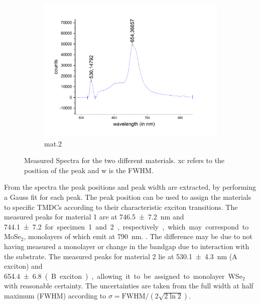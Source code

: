 \begin{figure}[H]
\begin{subfigure}{0.51\textwidth}
        \centering
        \includegraphics[width=\textwidth]{img/output_t1/spekt_m2}
        \caption{mat.2}
	      \label{fig_mono_spec3_1dspec}
    \end{subfigure}
    \caption{Measured Spectra for the two different materials. xc refers to the position of the peak and w is the FWHM.}
	\label{fig_mono_1dspectra} %
\end{figure}

From the spectra the peak positions and peak width are extracted, by performing a Gauss fit for each peak.
The peak position can be used to assign the materials to specific TMDCs according to their characteristic exciton transitions.
The measured peaks for material 1 are at \SI{746,5\pm 7,2}{nm} and \SI{744,1 \pm 7,2} for specimen 1 and 2, respectively, which may correspond to MoSe$_2$, monolayers of which emit at \SI{790}{nm}. \cite{Tonndorf2013}.
The difference may be due to not having measured a monolayer or change in the bandgap due to interaction with the substrate.
The measured peaks for material 2 lie at \SI{530,1 \pm 4,3}{nm} (A exciton) and \SI{654,4 \pm 6,8} (B exciton), allowing it to be assigned to monolayer WSe$_2$ with reasonable certainty.
The uncertainties are taken from the full width at half maximum (FWHM) according to $\sigma = \mathrm{FWHM}/(2\sqrt{2 \ln 2})$.
